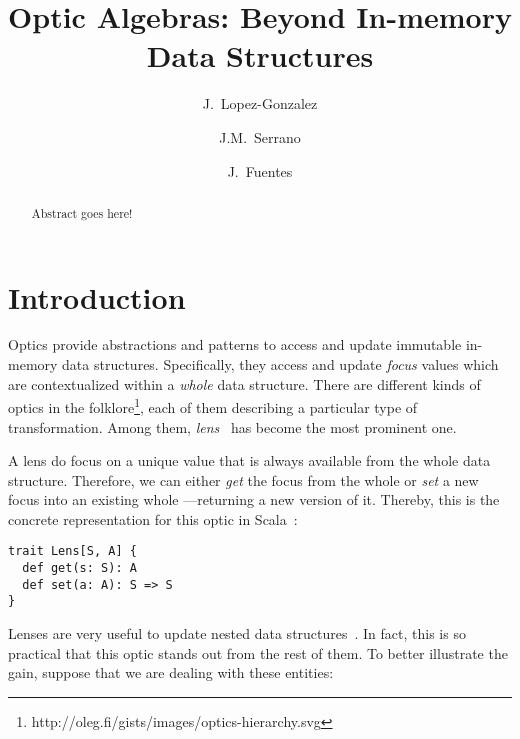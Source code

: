 \documentclass[final, twocolumn, 3p]{elsarticle}
\begin{document}
\begin{frontmatter}

\title{Optic Algebras: Beyond In-memory Data Structures}

\author[urjc,habla]{J.~Lopez-Gonzalez}

\author[urjc,habla]{J.M.~Serrano}

\author[habla]{J.~Fuentes}



\address[urjc]{Universidad Rey Juan Carlos}
\address[habla]{Habla Computing}

\begin{abstract}
Abstract goes here!
\end{abstract}

\end{frontmatter}

\lstset{language=Scala, basicstyle=\small}

\section{Introduction}

Optics provide abstractions and patterns to access and update immutable
in-memory data structures. Specifically, they access and update \emph{focus}
values which are contextualized within a \emph{whole} data structure. There are
different kinds of optics in the
folklore\footnote{http://oleg.fi/gists/images/optics-hierarchy.svg}, each of
them describing a particular type of transformation. Among them,
\emph{lens}~\cite{foster2005combinators} has become the most prominent one.

A lens do focus on a unique value that is always available from the whole data
structure. Therefore, we can either \emph{get} the focus from the whole or
\emph{set} a new focus into an existing whole ---returning a new version of it.
Thereby, this is the concrete representation for this optic in
Scala~\cite{odersky2004overview}:

\begin{lstlisting}
trait Lens[S, A] {
  def get(s: S): A
  def set(a: A): S => S
}
\end{lstlisting}

Lenses are very useful to update nested data
structures~\cite{morris2012asymmetric}. In fact, this is so practical that this
optic stands out from the rest of them. To better illustrate the gain, suppose
that we are dealing with these entities:
\end{document}
